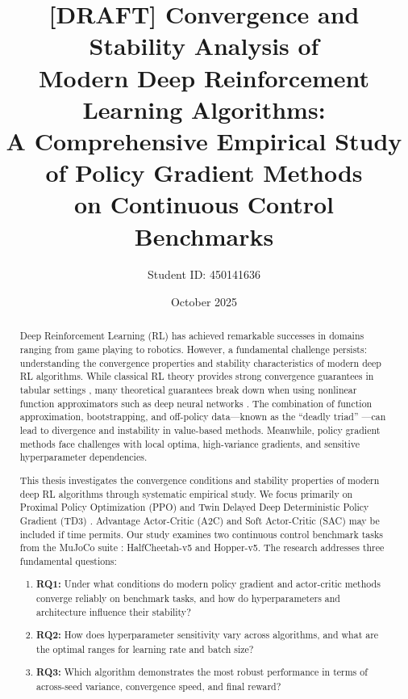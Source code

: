 \documentclass[12pt,a4paper]{report}
\title{\textbf{[DRAFT] Convergence and Stability Analysis of \\
Modern Deep Reinforcement Learning Algorithms:} \\[0.5em]
A Comprehensive Empirical Study of Policy Gradient Methods \\
on Continuous Control Benchmarks}
\author{Student ID: 450141636}
\date{October 2025}
\begin{document}
\maketitle

\begin{abstract}
\noindent
Deep Reinforcement Learning (RL) has achieved remarkable successes in domains ranging from game playing to robotics. However, a fundamental challenge persists: understanding the convergence properties and stability characteristics of modern deep RL algorithms. While classical RL theory provides strong convergence guarantees in tabular settings \cite{regehr2021elementary}, many theoretical guarantees break down when using nonlinear function approximators such as deep neural networks \cite{cayci2021sample}. The combination of function approximation, bootstrapping, and off-policy data—known as the ``deadly triad'' \cite{van2018deep}—can lead to divergence and instability in value-based methods. Meanwhile, policy gradient methods face challenges with local optima, high-variance gradients, and sensitive hyperparameter dependencies.

This thesis investigates the convergence conditions and stability properties of modern deep RL algorithms through systematic empirical study. We focus primarily on Proximal Policy Optimization (PPO) \cite{schulman2017ppo} and Twin Delayed Deep Deterministic Policy Gradient (TD3) \cite{fujimoto2018addressing}. Advantage Actor-Critic (A2C) and Soft Actor-Critic (SAC) may be included if time permits. Our study examines two continuous control benchmark tasks from the MuJoCo suite \cite{todorov2012mujoco}: HalfCheetah-v5 and Hopper-v5. The research addresses three fundamental questions:

\begin{enumerate}[leftmargin=2cm]
    \item \textbf{RQ1:} Under what conditions do modern policy gradient and actor-critic methods converge reliably on benchmark tasks, and how do hyperparameters and architecture influence their stability?
    \item \textbf{RQ2:} How does hyperparameter sensitivity vary across algorithms, and what are the optimal ranges for learning rate and batch size?
    \item \textbf{RQ3:} Which algorithm demonstrates the most robust performance in terms of across-seed variance, convergence speed, and final reward?
\end{enumerate}


\end{abstract}
\end{document}
